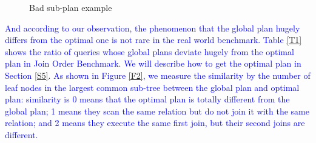 \begin{figure}[htb]
{\begin{minipage}[t]{0.3\linewidth}
            \end{minipage}
        }
        \centering
        \caption{Bad sub-plan example}
        \label{F21}
        \Description{}
    \end{figure}\par
\textcolor{blue}{
    And according to our observation, the phenomenon that the global plan hugely differs from the optimal one is not rare in the real world benchmark. Table \ref{T1} shows the ratio of queries whose global plans deviate hugely from the optimal plan in Join Order Benchmark. We will describe how to get the optimal plan in Section \ref{S5}. As shown in Figure \ref{F2}, we measure the similarity by the number of leaf nodes in the largest common sub-tree between the global plan and optimal plan: similarity is 0 means that the optimal plan is totally different from the global plan; 1 means they scan the same relation but do not join it with the same relation; and 2 means they execute the same first join, but their second joins are different.
}
